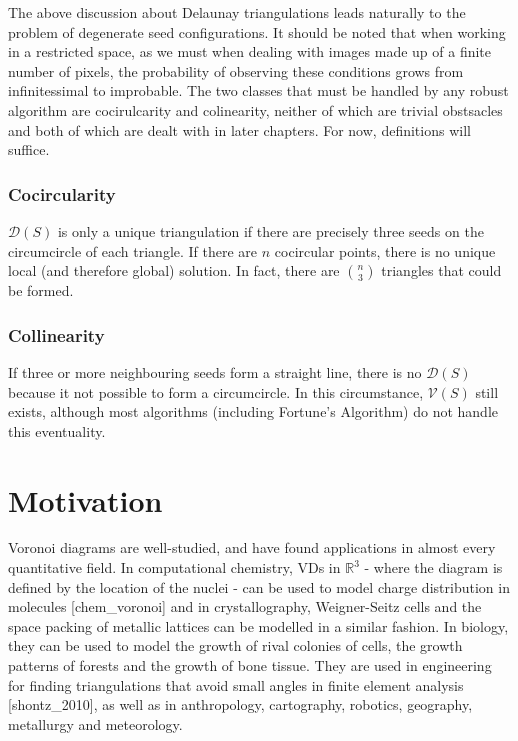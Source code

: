 \documentclass[12pt, report, a4paper, titlepage]{article}
\numberwithin{equation}{section}
\newcommand*{\citen}{}%
\DeclareRobustCommand*{\citen}[1]{%
  \begingroup
    \romannumeral-`\x %
    \setcitestyle{numbers}%
    \cite{#1}%
  \endgroup
}
\begin{document}
The above discussion about Delaunay triangulations leads naturally to the problem of degenerate seed configurations. It should be noted that when working in a restricted space, as we must when dealing with images made up of a finite number of pixels, the probability of observing these conditions grows from infinitessimal to improbable. The two classes that must be handled by any robust algorithm are cocirulcarity and colinearity, neither of which are trivial obstsacles and both of which are dealt with in later chapters. For now, definitions will suffice.

\subsubsection{Cocircularity}

$\mathcal{D}(S)$ is only a unique triangulation if there are precisely three seeds on the circumcircle of each triangle. If there are $n$ cocircular points, there is no unique local (and therefore global) solution. In fact, there are ${n\choose 3}$ triangles that could be formed.

\subsubsection{Collinearity}

If three or more neighbouring seeds form a straight line, there is no $\mathcal{D}(S)$ because it not possible to form a circumcircle. In this circumstance, $\mathcal{V}(S)$ still exists, although most algorithms (including Fortune's Algorithm) do not handle this eventuality.

\section{Motivation}

Voronoi diagrams are well-studied, and have found applications in almost every quantitative field. In computational chemistry, VDs in $\mathbb{R}^3$ - where the diagram is defined by the location of the nuclei - can be used to model charge distribution in molecules [\citen{chem_voronoi}] and in crystallography, Weigner-Seitz cells and the space packing of metallic lattices can be modelled in a similar fashion. In biology, they can be used to model the growth of rival colonies of cells, the growth patterns of forests and the growth of bone tissue. They are used in engineering for finding triangulations that avoid small angles in finite element analysis [\citen{shontz_2010}], as well as in anthropology, cartography, robotics, geography, metallurgy and meteorology.
\end{document}
